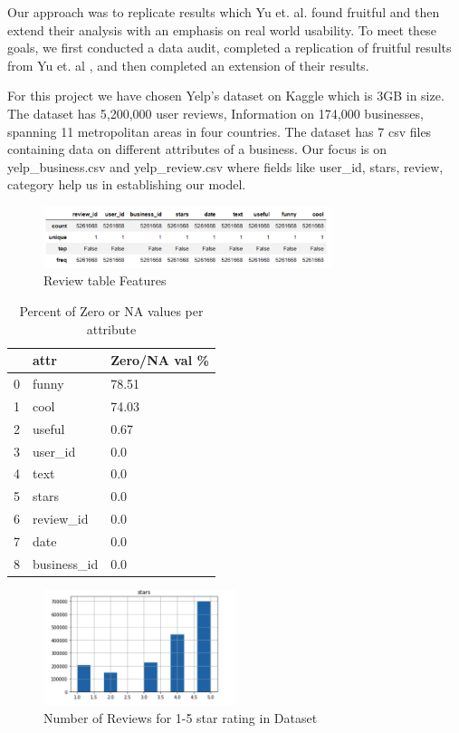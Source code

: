 \documentclass[12pt]{article}
\begin{document}
Our approach was to replicate results which Yu et. al. \cite{yu2015restaurants} found
fruitful and then extend their analysis with an emphasis on real world usability. To meet
these goals, we first conducted a data audit, completed a replication of fruitful results
from Yu et. al \cite{yu2015restaurants}, and then completed an extension of their results.

For this project we have chosen Yelp’s dataset on Kaggle \cite{YelpData59:online}
which is 3GB in size. The dataset has 5,200,000 user reviews, Information on 174,000 businesses,
spanning 11 metropolitan areas in four countries. The dataset has 7 csv files containing data on
different attributes of a business. Our focus is on yelp\_business.csv and yelp\_review.csv where
fields like user\_id, stars, review, category help us in establishing our model.

\begin{figure}[h]
  \caption{Review table Features}
  \centering
  \includegraphics[width=0.75\textwidth]{review_table}
  \end{figure}
  
  \begin{table}[h]
	\caption{Percent of Zero or NA values per attribute}
	\begin{tabular}{|l|l|l|}
	\hline
    \textbf{} & \textbf{attr} & \textbf{Zero/NA val \%} \\
	\hline 
	0         & funny     & 78.51    \\
	\hline 
	1         & cool      & 74.03  \\
 	\hline 
 	2 & useful      & 0.67    \\
 	\hline
 	3 & user_id      & 0.0   \\
 	\hline
 	4 & text      & 0.0    \\
 	\hline
 	5 & stars      & 0.0   \\
 	\hline
 	6 & review_id      & 0.0   \\
 	\hline
 	7 & date      & 0.0   \\
 	\hline
 	8 & business_id      & 0.0  \\
 	\hline
\end{tabular}
\end{table}
  
  \begin{figure}[h]
  \caption{Number of Reviews for 1-5 star rating in Dataset}
  \centering
  \includegraphics[width=0.5\textwidth]{rating}
  \end{figure}
\end{document}
